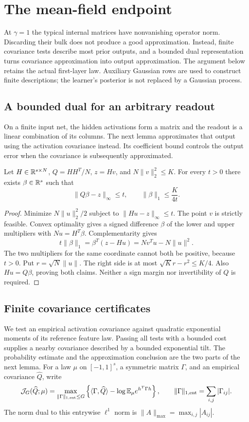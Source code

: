 \section{The mean-field endpoint}\label{sec:meanfield}
At $\gamma=1$ the typical internal matrices have nonvanishing operator
norm. Discarding their bulk does not produce a good approximation.
Instead, finite covariance tests describe most prior outputs, and a
bounded dual representation turns covariance approximation into output
approximation. The argument below retains the actual first-layer law.
Auxiliary Gaussian rows are used to construct finite descriptions; the
learner's posterior is not replaced by a Gaussian process.

\subsection{A bounded dual for an arbitrary readout}
On a finite input net, the hidden activations form a matrix and the
readout is a linear combination of its columns. The next lemma
approximates that output using the activation covariance instead. Its
coefficient bound controls the output error when the covariance is
subsequently approximated.
\begin{lemma}\label{lem:readout}
Let $H\in\mathbb R^{s\times N}$, $Q=HH^T/N$, $z=Hv$, and
$N\|v\|_2^2\leq K$. For every $t>0$ there exists $\beta\in\mathbb R^s$
such that
\[
 \|Q\beta-z\|_\infty\leq t,\qquad
 \|\beta\|_1\leq\frac K{4t}.
\]
\end{lemma}
\begin{proof}
Minimize $N\|u\|_2^2/2$ subject to $\|Hu-z\|_\infty\leq t$.
The point $v$ is strictly feasible. Convex optimality gives a signed
difference $\beta$ of the lower and upper multipliers with
$Nu=H^T\beta$. Complementarity gives
\[
 t\|\beta\|_1=\beta^T(z-Hu)
 =Nv^Tu-N\|u\|^2.
\]
The two multipliers for the same coordinate cannot both be positive,
because $t>0$. Put $r=\sqrt N\|u\|$. The right side is at most
$\sqrt K r-r^2\leq K/4$. Also $Hu=Q\beta$, proving both claims.
Neither a sign margin nor invertibility of $Q$ is required.
\end{proof}

\subsection{Finite covariance certificates}
We test an empirical activation covariance against quadratic
exponential moments of its reference feature law. Passing all tests
with a bounded cost supplies a nearby covariance described by a
bounded exponential tilt. The probability estimate and the approximation
conclusion are the two parts of the next lemma.
For a law $\mu$ on $[-1,1]^s$, a symmetric matrix $\Gamma$, and an
empirical covariance $\widehat Q$, write
\[
 \mathcal J_G(\widehat Q;\mu)=
 \max_{\|\Gamma\|_{1,\rm ent}\leq G}
 \left\{\langle\Gamma,\widehat Q\rangle
       -\log\mathbb E_\mu e^{h^T\Gamma h}\right\},\qquad
 \|\Gamma\|_{1,\rm ent}=\sum_{i,j}|\Gamma_{ij}|.
\]
The norm dual to this entrywise $\ell^1$ norm is
$\|A\|_{\max}=\max_{i,j}|A_{ij}|$.

